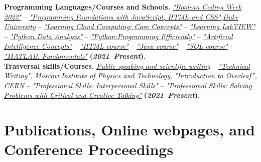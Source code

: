 \documentclass[11pt]{res}
\newcommand{\MarginText}[1]{\section{#1}\vspace{10pt}}
\begin{document}
\begin{resume}
\textbf{Programming Languages/Courses and Schools.}
\href{https://drive.google.com/file/d/1x15muyjCytZql1GQQzXSIICASMkJIKWh/view?usp=sharing}{\textit{"Boolean Coding Week 2022"}} -- \href{https://www.coursera.org/account/accomplishments/certificate/QVDWWH3C8MXV}{\textit{"Programming Foundations with JavaScript, HTML and CSS",Duke University}} -- \href{https://drive.google.com/file/d/1QbnkoML6oBqluVR8ciEqyPicE8jnGo6J/view?usp=sharing}{\textit{"Learning Cloud Computing: Core Concepts"}} -- \href{https://drive.google.com/file/d/1rHMOA8m3MLs0F8_AqIUldhX4vzZbFTGQ/view?%usp=sharing}{\textit{"Learning LabVIEW"}} -- \href{https://drive.google.com/file/d/1FxyFXUghhG-g39umhRG-oX6sN0CRhyAk/view?%usp=sharing}{\textit{"Python Data Analysis"}} -- \href{https://drive.google.com/file/d/1xa-h0UXAjloY4ojJNbiFfJ4nO93Q6wJi/view?%usp=sharing}{\textit{"Python:Programming Efficiently"}} -- \href{https://drive.google.com/file/d/1t3VZrkz1vKlDDB1VhK8Rp0oTFCH86xB1/view}{\textit{"Artificial Intelligence Concepts"}} -- \href{https://www.sololearn.com/Certificate/1014-12467510/pdf/}{\textit{"HTML course"}} -- \href{https://www.sololearn.com/Certificate/1068-12467510/pdf/}{\textit{"Java course"}} -- \href{https://www.sololearn.com/Certificate/1060-12467510/pdf/}{\textit{"SQL course"}} -- \href{https://matlabacademy.mathworks.com/progress/share/certificate.html?id=7a4f829d-5d7d-477e-b477-9ef7dc57bc81}{\textit{"MATLAB: Fundamentals"}} \textbf{(\textit{2021--Present})}.\\

\textbf{Trasversal skills/Courses.}
\href{https://drive.google.com/file/d/119ZkpA4OGFroNh0O9Hs60HvjqiKpUPq0/view?usp=sharing}{\textit{Public speaking and scientific writing}} -- \href{https://www.coursera.org/account/accomplishments/certificate/83WJM6X4DY27}{\textit{"Technical Writing", Moscow Institute of Physics and Technology}}, \href{https://drive.google.com/file/d/1to79c-kiCDjbMWiXxkL1zJY3JnbfbXGx/view}{\textit{"Introduction to Overleaf”, CERN}} -- \href{https://drive.google.com/file/d/1t3VZrkz1vKlDDB1VhK8Rp0oTFCH86xB1/view}{\textit{"Professional Skills: Interpersonal Skills"}} --  \href{https://drive.google.com/file/d/1t3VZrkz1vKlDDB1VhK8Rp0oTFCH86xB1/view}{\textit{"Professional Skills: Solving Problems with Critical and Creative Talking"}} \textbf{(\textit{2021--Present})}.\\

\MarginText{Publications, Online webpages, and Conference Proceedings}\label{publications}


\end{resume}
\end{document}
